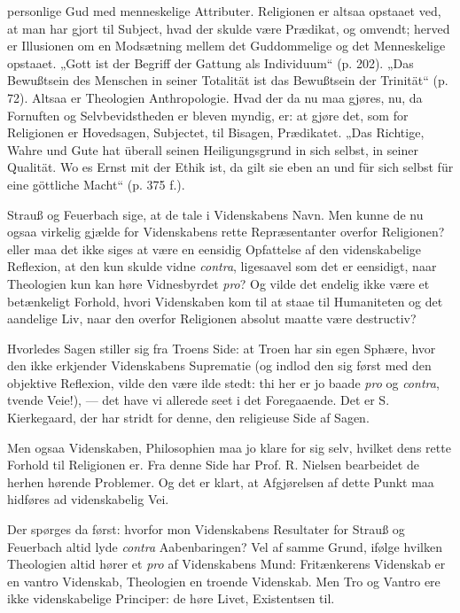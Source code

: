 \documentclass[12pt,a4paper]{book}
\newcommand{\opage}[1]{\marginnote{\footnotesize\textit{[#1]}}}
\begin{document}
personlige Gud med menneskelige Attributer. Religionen er
altsaa opstaaet ved, at man har gjort til Subject, hvad der
skulde være Prædikat, og omvendt; herved er Illusionen om
en Modsætning mellem det Guddommelige og det Menneskelige
opstaaet. „Gott ist der Begriff der Gattung als Individuum“
(p. 202). „Das Bewußtsein des Menschen in seiner
Totalität ist das Bewußtsein der Trinität“ (p. 72). Altsaa
er Theologien Anthropologie. Hvad der da nu maa gjøres,
nu, da Fornuften og Selvbevidstheden er bleven myndig, er:
at gjøre det, som for Religionen er Hovedsagen, Subjectet,
til Bisagen, Prædikatet. „Das Richtige, Wahre und Gute
hat überall seinen Heiligungsgrund in sich selbst, in seiner
Qualität. Wo es Ernst mit der Ethik ist, da gilt sie eben an
und für sich selbst für eine göttliche Macht“ (p. 375 f.).

Strauß og Feuerbach sige, at de tale i Videnskabens
Navn. Men kunne de nu ogsaa virkelig gjælde for Videnskabens
rette Repræsentanter overfor Religionen? eller maa det
ikke siges at være en eensidig Opfattelse af den videnskabelige
Reflexion, at den kun skulde vidne \textit{contra}, ligesaavel som det
\opage{38}\setcounter{footnote}{0}%
er eensidigt, naar Theologien kun kan høre Vidnesbyrdet \textit{pro}?
Og vilde det endelig ikke være et betænkeligt Forhold, hvori
Videnskaben kom til at staae til Humaniteten og det aandelige
Liv, naar den overfor Religionen absolut maatte være destructiv?

Hvorledes Sagen stiller sig fra Troens Side: at Troen
har sin egen Sphære, hvor den ikke erkjender Videnskabens
Suprematie (og indlod den sig først med den objektive Reflexion,
vilde den være ilde stedt: thi her er jo baade \textit{pro} og
\textit{contra}, tvende Veie!), --- det have vi allerede seet i det
Foregaaende. Det er S. Kierkegaard, der har stridt for denne,
den religieuse Side af Sagen.

Men ogsaa Videnskaben, Philosophien maa jo klare for
sig selv, hvilket dens rette Forhold til Religionen er. Fra
denne Side har Prof. R. Nielsen bearbeidet de herhen hørende
Problemer. Og det er klart, at Afgjørelsen af dette Punkt
maa hidføres ad videnskabelig Vei.

Der spørges da først: hvorfor mon Videnskabens Resultater
for Strauß og Feuerbach altid lyde \textit{contra} Aabenbaringen?
Vel af samme Grund, ifølge hvilken Theologien altid hører
et \textit{pro} af Videnskabens Mund: Fritænkerens Videnskab er en
vantro Videnskab, Theologien en troende Videnskab. Men Tro
og Vantro ere ikke videnskabelige Principer: de høre Livet,
Existentsen til.
\end{document}
